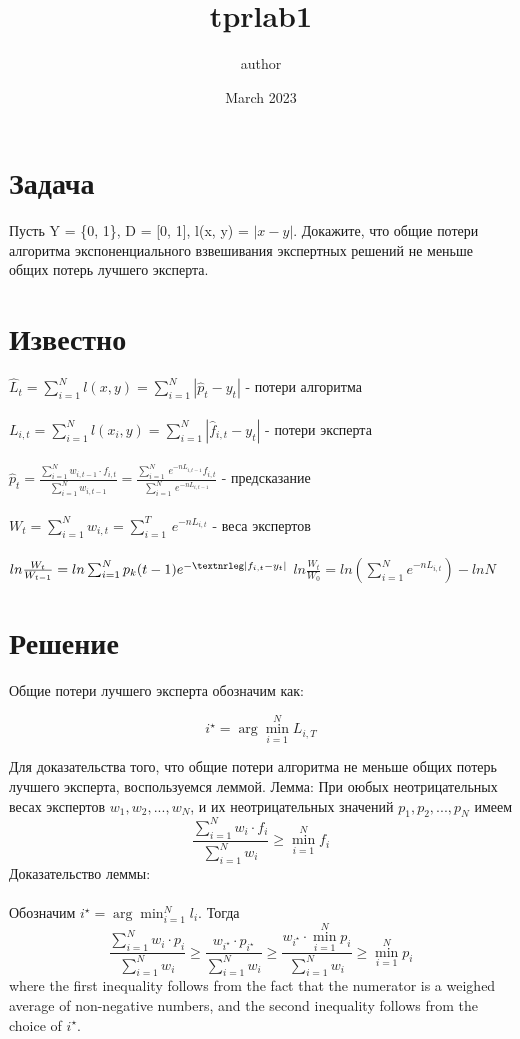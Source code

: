 \documentclass{article}
\title{tprlab1}
\author{author}
\date{March 2023}
\newcommand{\mathnrleg}{\textnormal{\textnrleg}}
\begin{document}
\maketitle

\section{Задача}
Пусть Y = \{0, 1\}, D = [0, 1], l(x, y) = $|x - y|$. Докажите, что общие потери алгоритма экспоненциального взвешивания экспертных решений не меньше общих потерь
лучшего эксперта.

\section{Известно}
{\Large
$\hat{L}_t = \sum_{i=1}^N l(x,y) = \sum_{i=1}^N |\hat{p}_t - y_t|$ - потери алгоритма \\\\
$L_{i,t} = \sum_{i=1}^N l(x_i,y) = \sum_{i=1}^N |\hat{f}_{i,t} - y_t|$ - потери эксперта \\\\
$\hat{p}_t = \frac{\sum_{i=1}^N w_{i,t-1} \cdot f_{i,t}}{\sum_{i=1}^N w_{i,t-1}} = \frac{\sum_{i=1}^{N}\, e^{-nL_{i,t-1}}f_{i,t}}{\sum_{i=1}^{N}\, e^{-nL_{i,t-1}}}$ - предсказание \\\\
$W_t = \sum_{i=1}^N w_{i,t} = \sum_{i=1}^{T}\, e^{-nL_{i,t}}$ - веса экспертов \\\\
$ln\frac{W_t}{W_{t-1}} = ln\sum_{i=1}^N p_k(t-1)e^{-\mathnrleg|f_{i,t}-y_t|} \\\\$
$ln\frac{W_t}{W_{0}} = ln(\sum_{i=1}^N e^{-nL_{i,t}})-lnN$
}

\section{Решение}
Общие потери лучшего эксперта обозначим как:

$$i^\star = \arg\min_{i=1}^N L_{i,T}$$

Для доказательства того, что общие потери алгоритма не меньше общих потерь лучшего эксперта, воспользуемся леммой.
Лемма: При оюбых неотрицательных весах экспертов $w_1, w_2, ..., w_N$, и их неотрицательных значений  $p_1, p_2, ..., p_N$ имеем
$$
\frac{\sum_{i=1}^N w_i\cdot f_i}{\sum_{i=1}^N w_i} \geq \min_{i=1}^N f_i
$$
Доказательство леммы: \\\\
Обозначим $i^\star = \arg\min_{i=1}^N l_i$. Тогда
$$
\frac{\sum_{i=1}^N w_i\cdot p_i}{\sum_{i=1}^N w_i} \geq \frac{w_{i^\star} \cdot p_{i^\star}}{\sum_{i=1}^N w_i} \geq \frac{w_{i^\star} \cdot \min_{i=1}^N p_i}{\sum_{i=1}^N w_i} \geq \min_{i=1}^N p_i
$$
where the first inequality follows from the fact that the numerator is a weighed average of non-negative numbers, and the second inequality follows from the choice of $i^\star$. \\
\end{document}
